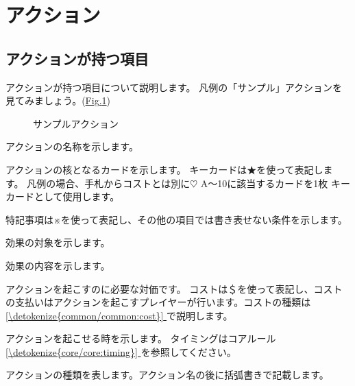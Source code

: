 \documentclass[letterpaper,10pt,dvipdfmx]{sphinxmanual}
\begin{document}
\section{アクション}
\label{\detokenize{common/common:id16}}

\subsection{アクションが持つ項目}
\label{\detokenize{common/common:id17}}
\sphinxAtStartPar
アクションが持つ項目について説明します。
凡例の「サンプル」アクションを見てみましょう。(\hyperref[\detokenize{common/common:action-sample}]{Fig.\@ \ref{\detokenize{common/common:action-sample}}})

\begin{figure}[htbp]
\centering
\capstart

\noindent{}
\caption{サンプルアクション}\label{\detokenize{common/common:id53}}\label{\detokenize{common/common:action-sample}}\end{figure}
\begin{description}
\sphinxAtStartPar
アクションの名称を示します。

\sphinxAtStartPar
アクションの核となるカードを示します。
キーカードは★を使って表記します。
凡例の場合、手札からコストとは別に{\normalsize $\heartsuit$} A〜10に該当するカードを1枚
キーカードとして使用します。

\sphinxAtStartPar
特記事項は※を使って表記し、その他の項目では書き表せない条件を示します。

\sphinxAtStartPar
効果の対象を示します。

\sphinxAtStartPar
効果の内容を示します。

\sphinxAtStartPar
アクションを起こすのに必要な対価です。
コストは＄を使って表記し、コストの支払いはアクションを起こすプレイヤーが行います。コストの種類は \hyperref[\detokenize{common/common:cost}]{\ref{\detokenize{common/common:cost}} } で説明します。

\sphinxAtStartPar
アクションを起こせる時を示します。
タイミングはコアルール \hyperref[\detokenize{core/core:timing}]{\ref{\detokenize{core/core:timing}} } を参照してください。

\sphinxAtStartPar
アクションの種類を表します。アクション名の後に括弧書きで記載します。

\end{description}
\end{document}
